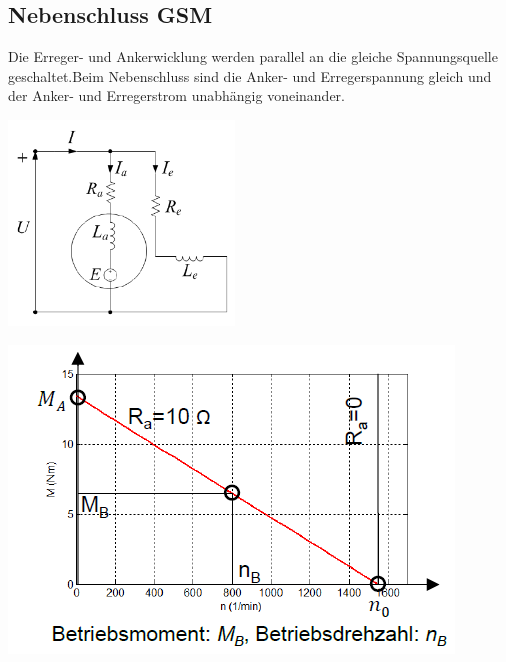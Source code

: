 \subsection{Nebenschluss GSM}
    Die Erreger- und Ankerwicklung werden parallel an die gleiche Spannungsquelle geschaltet.\newline Beim Nebenschluss sind die Anker- und Erregerspannung gleich und der Anker- und Erregerstrom unabhängig \newline voneinander. \\
    \begin{minipage}[b]{0.4\textwidth}
    	\raggedright
    	\includegraphics[width=6cm]{images/Nebenschluss_GSM.png}
    \end{minipage}
    \begin{minipage}[b]{0.5\textwidth}
    	\raggedright
    	\includegraphics[scale = 0.8]{images/KennlinieNebenschluss1}
    \end{minipage}\\
    
